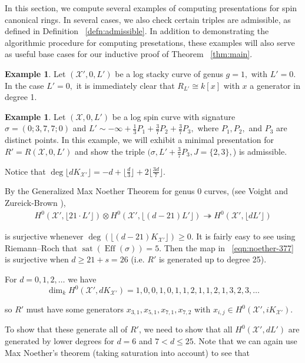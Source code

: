 \documentclass{amsart}
\theoremstyle{plain}
\theoremstyle{definition}
\newtheorem{example}[thm]{Example}
\theoremstyle{remark}
\numberwithin{equation}{section}
\newcommand \sx{\mathscr X}
\newcommand{\halfcan}{L}
\DeclareMathOperator{\Eff}{Eff}
\DeclareMathOperator{\sat}{sat}
\begin{document}
In this section, we compute several examples of computing presentations for spin canonical rings. In several cases, we also check certain triples are admissible, as defined in Definition ~\ref{defn:admissible}. In addition to demonstrating the algorithmic procedure for computing presetations, these examples will also serve as useful base cases for our inductive proof of Theorem ~\ref{thm:main}.

\begin{example}
\label{eg:base-1-0}
Let $(\sx',0,L')$ be a log stacky curve of genus $g = 1,$ with $\halfcan' = 0$. In the case $\halfcan' = 0,$ it is immediately clear that $R_{\halfcan'} \cong k[x]$ with $x$ a generator in degree 1.
\end{example}


\begin{example}
\label{ex:base-377}
Let $(\sx,0,\halfcan')$ be a log spin curve with signature $\sigma =
(0; 3, 7, 7; 0)$ and $\halfcan' \sim -\infty + \frac{1}{3} P_1 +
\frac{3}{7} P_2 + \frac{3}{7} P_3,$ where $P_1,P_2,$ and $P_3$ are distinct points. In this example, we will exhibit a minimal presentation for $R' = R(\sx,0,\halfcan')$ and show the triple $(\sigma, \halfcan' + \frac{3}{7} P_3, J = \{2, 3\},$) is admissible.

Notice that $\deg \lfloor d K_{\sx'} \rfloor= -d + \lfloor \frac{d}{3}
\rfloor + 2 \lfloor \frac{3d}{7} \rfloor$.

By the Generalized Max Noether Theorem for genus 0 curves, (see Voight
and Zureick-Brown \cite[Lemma 3.1.1]{vzb:stacky}),
\begin{align}
\label{eqn:noether-377}
	H^0 (\sx', \lfloor 21 \cdot \halfcan' \rfloor) \otimes H^0 (\sx', \lfloor
	(d - 21) \halfcan' \rfloor) \twoheadrightarrow H^0 (\sx', \lfloor
	d \halfcan' \rfloor)
\end{align}

\noindent
is surjective whenever $\deg (\lfloor (d - 21) K_{\sx'} \rfloor)
\geq 0$. It is fairly easy to see using Riemann--Roch that $\sat(\Eff(\sigma)) = 5.$
Then the map in ~\eqref{eqn:noether-377} is surjective
when $d \geq 21 + s = 26$ (i.e. $R'$ is generated up to degree 25).

For $d = 0, 1, 2, \ldots$ we have
\[
	\dim_k H^0 (\sx', d K_{\sx'}) = 1, 0, 0, 1, 0, 1, 1, 2, 1, 1, 2, 1, 3, 2, 3, \ldots
\]

\noindent
so $R'$ must have some generators $x_{3, 1}, x_{5, 1}, x_{7, 1},
x_{7, 2}$ with $x_{i, j} \in H^0(\sx', i K_{\sx'})$.

To show that these generate all of $R'$, we need to show that all
$H^0 (\sx', d \halfcan')$ are generated by lower degrees for $d = 6$
and $7 < d \leq 25$. Note that we can again use Max Noether's theorem
(taking saturation into account) to see that


\end{example}
\end{document}
